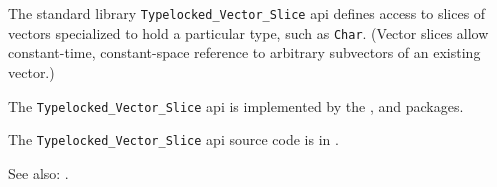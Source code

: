 

The standard library {\tt Typelocked\_Vector\_Slice} api defines access to slices of vectors 
specialized to hold a particular type, such as {\tt Char}.  (Vector slices allow constant-time, 
constant-space reference to arbitrary subvectors of an existing vector.)

The {\tt Typelocked\_Vector\_Slice} api is implemented by the 
, 
 and 
 packages.

The {\tt Typelocked\_Vector\_Slice} api source code is in .

See also: .





